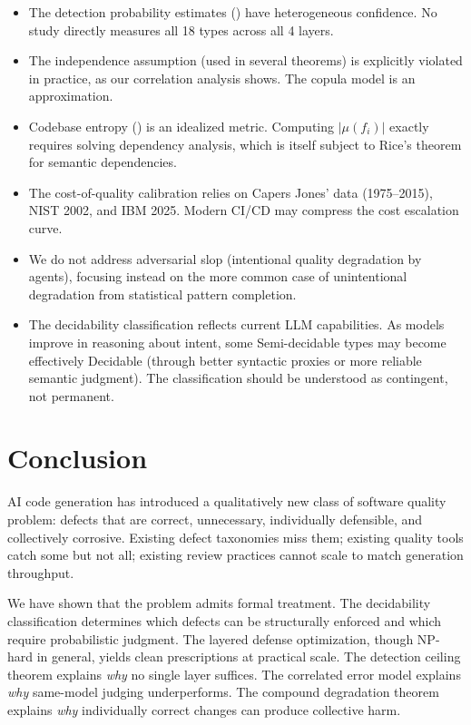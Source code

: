 \documentclass[11pt, a4paper, logo, copyright]{googledeepmind}
\begin{document}
\begin{itemize}
\item The detection probability estimates () have heterogeneous confidence. No study directly measures all 18 types across all 4 layers.
\item The independence assumption (used in several theorems) is explicitly violated in practice, as our correlation analysis shows. The copula model is an approximation.
\item Codebase entropy () is an idealized metric. Computing $|\mu(f_i)|$ exactly requires solving dependency analysis, which is itself subject to Rice's theorem for semantic dependencies.
\item The cost-of-quality calibration relies on Capers Jones' data (1975--2015), NIST 2002, and IBM 2025. Modern CI/CD may compress the cost escalation curve.
\item We do not address adversarial slop (intentional quality degradation by agents), focusing instead on the more common case of unintentional degradation from statistical pattern completion.
\item The decidability classification reflects current LLM capabilities. As models improve in reasoning about intent, some Semi-decidable types may become effectively Decidable (through better syntactic proxies or more reliable semantic judgment). The classification should be understood as contingent, not permanent.
\end{itemize}


\section{Conclusion}
\label{sec:conclusion}

AI code generation has introduced a qualitatively new class of software quality problem: defects that are correct, unnecessary, individually defensible, and collectively corrosive. Existing defect taxonomies miss them; existing quality tools catch some but not all; existing review practices cannot scale to match generation throughput.

We have shown that the problem admits formal treatment. The decidability classification determines which defects can be structurally enforced and which require probabilistic judgment. The layered defense optimization, though NP-hard in general, yields clean prescriptions at practical scale. The detection ceiling theorem explains \emph{why} no single layer suffices. The correlated error model explains \emph{why} same-model judging underperforms. The compound degradation theorem explains \emph{why} individually correct changes can produce collective harm.
\end{document}
